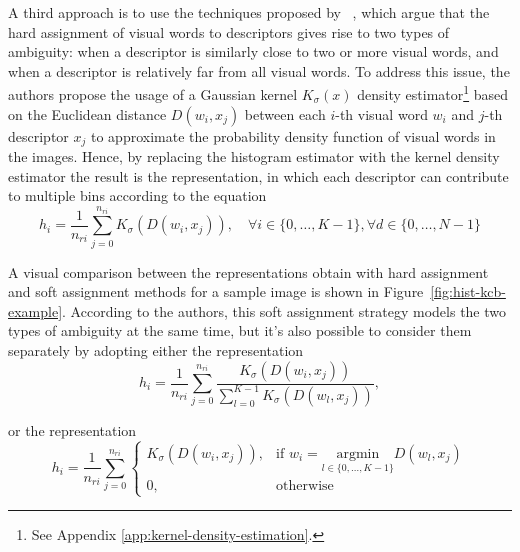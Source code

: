 \documentclass[../main.tex]{subfiles}
\begin{document}
A third approach is to use the  techniques proposed by
~\cite{gemert}, which argue that the hard assignment of
visual words to descriptors gives rise to two types of ambiguity:  when a descriptor is similarly close to two or more visual words,
and  when a descriptor is relatively far from all
visual words.
To address this issue, the authors propose the usage of a Gaussian kernel
$K_{\sigma}(x)$  density estimator\footnote{See Appendix
\ref{app:kernel-density-estimation}.} based on the Euclidean distance $D(w_i,
x_j)$ between each $i$-th visual word $w_i$ and $j$-th descriptor $x_j$ to
approximate the probability density function of visual words in the images.
Hence, by replacing the histogram estimator with
the kernel density estimator the result is the 
representation, in which each descriptor can contribute to multiple bins
according to the equation
\begin{equation}\label{eq:kcb}
	h_i = \frac{1}{n_{ri}} \sum_{j=0}^{n_{ri}} K_{\sigma}(D(w_i, x_j)),
	\quad
	\forall i \in \{0, \ldots, K-1\},
	\forall d \in \{0, \ldots, N-1\}
\end{equation}

A visual comparison between the representations obtain with hard
assignment and soft assignment methods for a sample image is shown in
Figure~\ref{fig:hist-kcb-example}.
According to the authors, this soft assignment strategy models the two types of
ambiguity at the same time, but it's also possible to consider them separately
by adopting either the  representation
\begin{equation}\label{eq:unc}
	h_i = \frac{1}{n_{ri}}
	\sum_{j=0}^{n_{ri}} \frac{K_{\sigma}(D(w_i, x_j))}{\sum_{l=0}^{K-1}
	K_{\sigma}(D(w_l, x_j))},
\end{equation}

or the  representation
\begin{equation}\label{eq:pla}
	h_i = \frac{1}{n_{ri}}
	\sum_{j=0}^{n_{ri}}
	\begin{cases}
		K_{\sigma}(D(w_i, x_j)), & \text{if } w_i = \underset{l \in \{0, \ldots, K-1\}}{\text{argmin}} D(w_l, x_j)\\
		0, & \text{otherwise}
	\end{cases}
\end{equation}
\end{document}
